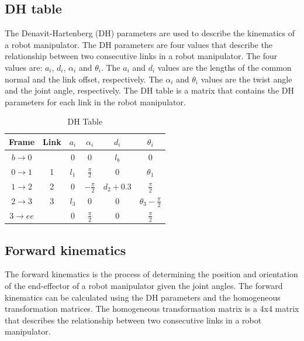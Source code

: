 \documentclass{article}
\begin{document}
\subsection{DH table}
The Denavit-Hartenberg (DH) parameters are used to describe the kinematics of a robot manipulator.
The DH parameters are four values that describe the relationship between two consecutive links in a robot manipulator.
The four values are: $a_i$, $d_i$, $\alpha_i$ and $\theta_i$. The $a_i$ and $d_i$ values are the lengths of the common normal and the link offset, respectively.
The $\alpha_i$ and $\theta_i$ values are the twist angle and the joint angle, respectively.
The DH table is a matrix that contains the DH parameters for each link in the robot manipulator.

\begin{table}[H]
    \centering
    \caption{DH Table}
    \renewcommand{\arraystretch}{1.5} %
    \begin{tabular}{|c|c|c|c|c|c|}
        \hline
        Frame              & Link & $a_i$ & $\alpha_i$       & $d_i$       & $\theta_i$                 \\ \hline
        $b \rightarrow 0$  &      & $0$   & 0                & $l_b$       & $0$                        \\ \hline
        $0 \rightarrow 1$  & 1    & $l_1$ & $\frac{\pi}{2}$  & 0           & $\theta_1$                 \\ \hline
        $1 \rightarrow 2$  & 2    & $0$   & $-\frac{\pi}{2}$ & $d_2 + 0.3$ & $\frac{\pi}{2}$            \\ \hline
        $2 \rightarrow 3$  & 3    & $l_3$ & 0                & 0           & $\theta_3 - \frac{\pi}{2}$ \\ \hline
        $3 \rightarrow ee$ &      & $0$   & $\frac{\pi}{2}$  & 0           & $\frac{\pi}{2}$            \\ \hline
    \end{tabular}
\end{table}


\subsection{Forward kinematics}
The forward kinematics is the process of determining the position and orientation of the end-effector of a robot manipulator given the joint angles.
The forward kinematics can be calculated using the DH parameters and the homogeneous transformation matrices.
The homogeneous transformation matrix is a 4x4 matrix that describes the relationship between two consecutive links in a robot manipulator.
\end{document}
